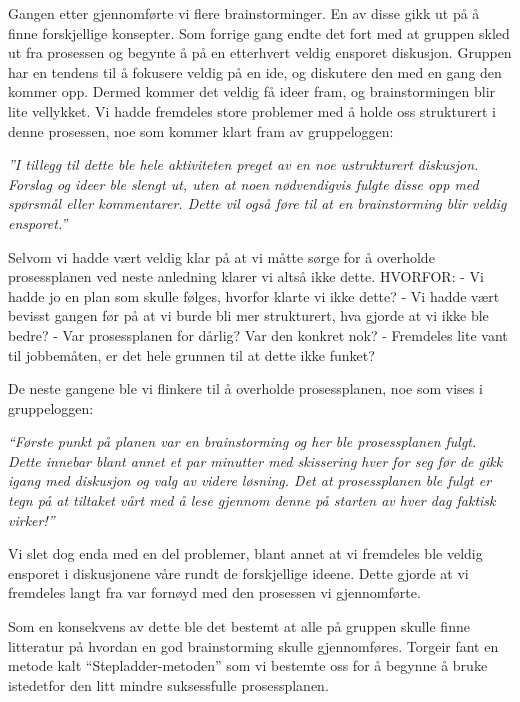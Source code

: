 Gangen etter gjennomførte vi flere brainstorminger. En av disse gikk ut på å finne forskjellige konsepter. Som forrige gang endte det fort med at gruppen skled ut fra prosessen og begynte å på en etterhvert veldig ensporet diskusjon. Gruppen har en tendens til å fokusere veldig på en ide, og diskutere den med en gang den kommer opp. Dermed kommer det veldig få ideer fram, og brainstormingen blir lite vellykket. Vi hadde fremdeles store problemer med å holde oss strukturert i denne prosessen, noe som kommer klart fram av gruppeloggen: \newline

\emph{”I tillegg til dette ble hele aktiviteten preget av en noe ustrukturert diskusjon. Forslag og ideer ble slengt ut, uten at noen nødvendigvis fulgte disse opp med spørsmål eller kommentarer. Dette vil også føre til at en brainstorming blir veldig ensporet.”} \newline

Selvom vi hadde vært veldig klar på at vi måtte sørge for å overholde prosessplanen ved neste anledning klarer vi altså ikke dette. HVORFOR:
 	- Vi hadde jo en plan som skulle følges, hvorfor klarte vi ikke dette?
- Vi hadde vært bevisst gangen før på at vi burde bli mer strukturert, hva gjorde at vi ikke  ble bedre?
- Var prosessplanen for dårlig? Var den konkret nok?
- Fremdeles lite vant til jobbemåten, er det hele grunnen til at dette ikke funket? \newline

De neste gangene ble vi flinkere til å overholde prosessplanen, noe som vises i gruppeloggen: \newline

\emph{“Første punkt på planen var en brainstorming og her ble prosessplanen fulgt. Dette 
innebar blant annet et par minutter med skissering hver for seg før de gikk igang med 
diskusjon og valg av videre løsning. Det at prosessplanen ble fulgt er tegn på at tiltaket vårt 
med å lese gjennom denne på starten av hver dag faktisk virker!”} \newline

Vi slet dog enda med en del problemer, blant annet at vi fremdeles ble veldig ensporet i diskusjonene våre rundt de forskjellige ideene. Dette gjorde at vi fremdeles langt fra var fornøyd med den prosessen vi gjennomførte. \newline

Som en konsekvens av dette ble det bestemt at alle på gruppen skulle finne litteratur på hvordan en god brainstorming skulle gjennomføres. Torgeir fant en metode kalt “Stepladder-metoden” som vi bestemte oss for å begynne å bruke istedetfor den litt mindre suksessfulle prosessplanen. \newline

